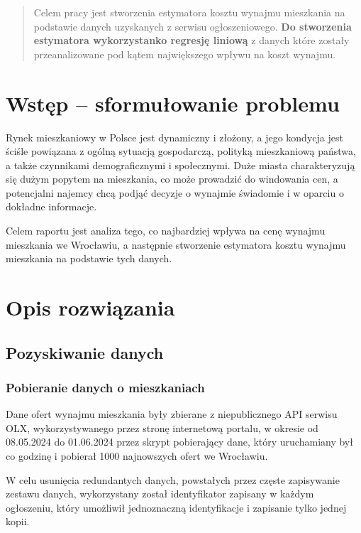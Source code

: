 \documentclass[10pt]{article}
\begin{document}


\begin{abstract}
Celem pracy jest stworzenia estymatora kosztu wynajmu mieszkania na podstawie danych uzyskanych z serwisu ogłoszeniowego. 
\textbf{Do stworzenia estymatora wykorzystanko regresję liniową} z danych które zostały przeanalizowane pod kątem największego wpływu na koszt wynajmu.
\end{abstract}

\section{Wstęp -- sformułowanie problemu}
\label{sec:wstep}

Rynek mieszkaniowy w Polsce jest dynamiczny i złożony, a jego kondycja jest ściśle powiązana z ogólną sytuacją gospodarczą, polityką mieszkaniową państwa, a także czynnikami demograficznymi i społecznymi. 
Duże miasta charakteryzują się dużym popytem na mieszkania, co może prowadzić do windowania cen, a potencjalni najemcy chcą podjąć decyzje o wynajmie świadomie i w oparciu o dokładne informacje.

Celem raportu jest analiza tego, co najbardziej wpływa na cenę wynajmu mieszkania we Wrocławiu, a następnie stworzenie estymatora kosztu wynajmu mieszkania na podstawie tych danych.


\section{Opis rozwiązania}

\subsection{Pozyskiwanie danych}
\subsubsection{Pobieranie danych o mieszkaniach}
Dane ofert wynajmu mieszkania były zbierane z niepublicznego API serwisu OLX, wykorzystywanego przez stronę internetową portalu, w okresie od 08.05.2024 do 01.06.2024 przez skrypt pobierający dane, który uruchamiany był co godzinę i pobierał 1000 najnowszych ofert we Wrocławiu.

W celu usunięcia redundantych danych, powstałych przez częste zapisywanie zestawu danych, wykorzystany został identyfikator zapisany w każdym ogłoszeniu, który umożliwił jednoznaczną identyfikacje i zapisanie tylko jednej kopii.
\end{document}
